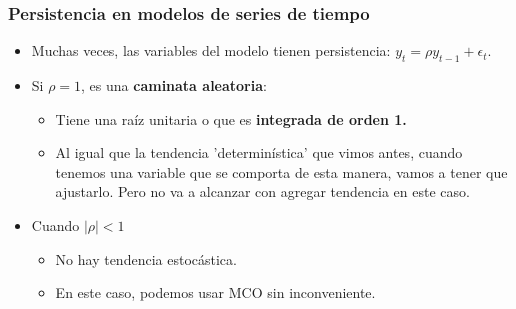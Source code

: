 \documentclass{beamer}
\begin{document}
\begin{frame}
\frametitle{Persistencia en modelos de series de tiempo}

\begin{itemize}
  \item Muchas veces, las variables del modelo tienen persistencia: $ y_t = \rho y_{t-1} + \epsilon_t $.
  \item Si \(\rho = 1\), es una \textbf{caminata aleatoria}:
  \begin{itemize}
    \item Tiene una raíz unitaria o que es \textbf{integrada de orden 1.}
       \item Al igual que la tendencia 'determinística' que vimos antes, cuando tenemos una variable que se comporta de esta manera, vamos a tener que ajustarlo. Pero no va a alcanzar con agregar tendencia en este caso.
  \end{itemize}
  \item Cuando \(|\rho| < 1\)
  \begin{itemize}
    \item No hay tendencia estocástica.
    \item En este caso, podemos usar MCO sin inconveniente.
  \end{itemize}
\end{itemize}

\end{frame}
\end{document}
